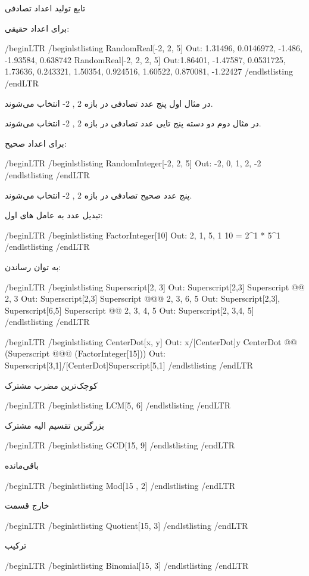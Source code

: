 تابع تولید اعداد تصادفی

برای اعداد حقیقی:

/begin{LTR}
/begin{lstlisting}
RandomReal[{-2, 2}, 5]     Out: {1.31496, 0.0146972, -1.486, -1.93584, 0.638742}
RandomReal[{-2, 2}, {2, 5}] Out:{{1.86401, -1.47587, 0.0531725, 1.73636, 0.243321}, 
{1.50354, 0.924516, 1.60522, 0.870081, -1.22427}}
/end{lstlisting}
/end{LTR}

در مثال اول پنج عدد تصادفی در بازه {2 ,  2-} انتخاب می‌شوند.

در مثال دوم دو دسته پنج تایی عدد تصادفی در بازه {2 ,  2-} انتخاب می‌شوند.

برای اعداد صحیح:

/begin{LTR}
/begin{lstlisting}
RandomInteger[{-2, 2}, 5]      Out: {-2, 0, 1, 2, -2}
/end{lstlisting}
/end{LTR}

پنج عدد صحیح تصادفی در بازه {2 ,  2-} انتخاب می‌شوند.

تبدیل عدد به عامل های اول:

/begin{LTR}
/begin{lstlisting}
FactorInteger[10]     Out: {{2, 1}, {5, 1}}      10 = 2^1 * 5^1
/end{lstlisting}
/end{LTR}

به توان رساندن:

/begin{LTR}
/begin{lstlisting}
Superscript[2, 3]        Out: Superscript[2,3]
Superscript @@ {2, 3}     Out: Superscript[2,3]
Superscript @@@ {{2, 3}, {6, 5}}        Out: {Superscript[2,3], Superscript[6,5]}
Superscript @@ {{2, 3}, {4, 5}}         Out: Superscript[{2, 3},{4, 5}]
/end{lstlisting}
/end{LTR}

/begin{LTR}
/begin{lstlisting}
CenterDot[x, y]           Out: x/[CenterDot]y
CenterDot @@ (Superscript @@@ (FactorInteger[15]))  Out: Superscript[3,1]/[CenterDot]Superscript[5,1]
/end{lstlisting}
/end{LTR}

کوچک‌ترین مضرب مشترک

/begin{LTR}
/begin{lstlisting}
LCM[5, 6]
/end{lstlisting}
/end{LTR}

بزرگترین تقسیم الیه مشترک

/begin{LTR}
/begin{lstlisting}
GCD[15, 9]
/end{lstlisting}
/end{LTR}

باقی‌مانده

/begin{LTR}
/begin{lstlisting}
Mod[15 , 2]
/end{lstlisting}
/end{LTR}

خارج قسمت

/begin{LTR}
/begin{lstlisting}
Quotient[15, 3]
/end{lstlisting}
/end{LTR}

ترکیب

/begin{LTR}
/begin{lstlisting}
Binomial[15, 3]
/end{lstlisting}
/end{LTR}

